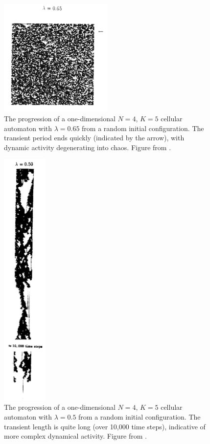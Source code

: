 \documentclass[a4paper,11pt,twoside]{report}
\begin{document}
\begin{figure}[htp]
\centering
\includegraphics[width=0.5\textwidth]{chaos_transient.png}
\caption[Chaotic CA Transient Length]{
The progression of a one-dimensional $N=4$, $K=5$ cellular automaton with $\lambda=0.65$ from a random initial configuration. The transient period ends quickly (indicated by the arrow), with dynamic activity degenerating into chaos. Figure from \citeauthor{la90} \cite{la90}.
}
\label{fig:chaos_trans}
\end{figure}

\begin{figure}[htp]
\centering
\includegraphics[width=0.20\textwidth]{long_transient.png}
\caption[Complex CA Transient Length]{
The progression of a one-dimensional $N=4$, $K=5$ cellular automaton with $\lambda=0.5$ from a random initial configuration. The transient length is quite long (over 10,000 time steps), indicative of more complex dynamical activity. Figure from \citeauthor{la90} \cite{la90}.
}
\label{fig:long_trans}
\end{figure}
\end{document}
